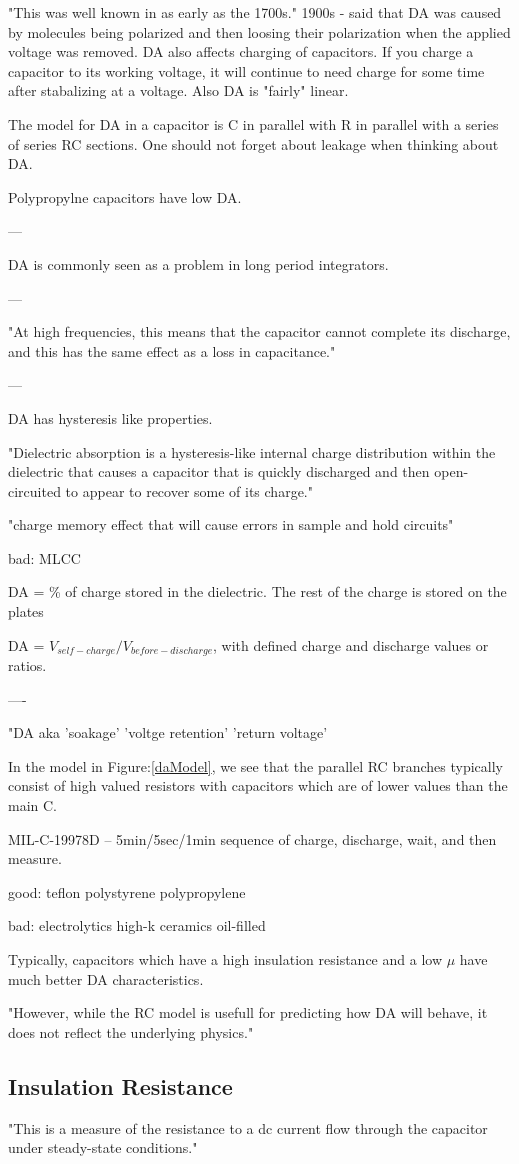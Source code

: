 "This was well known in as early as the 1700s." \cite{rap_da}
1900s - said that DA was caused by molecules being polarized and then loosing their polarization when the applied voltage was removed.
DA also affects charging of capacitors. If you charge a capacitor to its working voltage, it will continue to need charge for some time after stabalizing at a voltage. Also DA is "fairly" linear.

The model for DA in a capacitor is C in parallel with R in parallel with a series of series RC sections. One should not forget about leakage when thinking about DA.

Polypropylne capacitors have low DA.

---

DA is commonly seen as a problem in long period integrators. \cite{rap_da2}

---

"At high frequencies, this means that the capacitor cannot complete its discharge, and this has the same effect as a loss in capacitance."\cite{disc_comp}

---

DA has hysteresis like properties.

"Dielectric absorption is a hysteresis-like internal charge distribution within the dielectric that causes a capacitor that is quickly discharged and then open-circuited to appear to recover some of its charge."

"charge memory effect that will cause errors in sample and hold circuits"

bad:
MLCC

DA = \% of charge stored in the dielectric. The rest of the charge is stored on the plates

DA = $V_{self-charge} / V_{before-discharge}$, with defined charge and discharge values or ratios.
\cite[Sect.~3.6.7]{elec_inv}

----

"DA aka 'soakage' 'voltge retention' 'return voltage'

In the model in Figure:\ref{daModel}, we see that the parallel RC branches typically consist of high valued resistors with capacitors which are of lower values than the main C.

MIL-C-19978D -- 5min/5sec/1min sequence of charge, discharge, wait, and then measure.

good:
teflon
polystyrene
polypropylene

bad:
electrolytics
high-k ceramics
oil-filled

Typically, capacitors which have a high insulation resistance and a low $\mu$ have much better DA characteristics.

"However, while the RC model is usefull for predicting how DA will behave, it does not reflect the underlying physics."
\cite{capSite_intro}

\subsection{Insulation Resistance}
"This is a measure of the resistance to a dc current flow through the capacitor under steady-state conditions."\cite[Sect.~3.6.7]{elec_inv}
